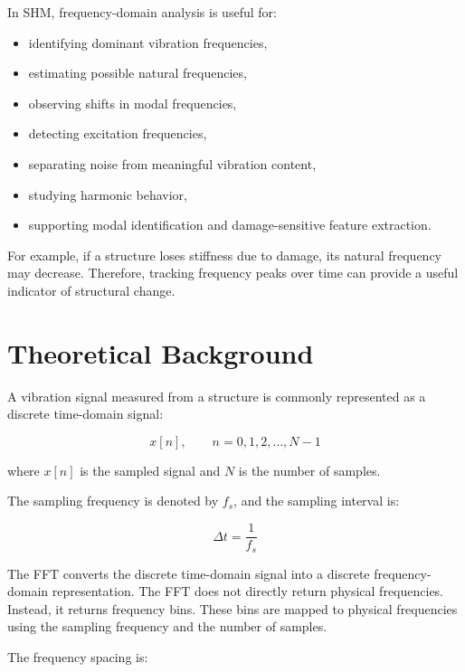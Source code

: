 \documentclass[11pt,a4paper]{article}
\begin{document}
In SHM, frequency-domain analysis is useful for:

\begin{itemize}
    \item identifying dominant vibration frequencies,
    \item estimating possible natural frequencies,
    \item observing shifts in modal frequencies,
    \item detecting excitation frequencies,
    \item separating noise from meaningful vibration content,
    \item studying harmonic behavior,
    \item supporting modal identification and damage-sensitive feature extraction.
\end{itemize}

For example, if a structure loses stiffness due to damage, its natural frequency may decrease. Therefore, tracking frequency peaks over time can provide a useful indicator of structural change.

\section{Theoretical Background}

A vibration signal measured from a structure is commonly represented as a discrete time-domain signal:

\begin{equation}
    x[n], \qquad n = 0,1,2,\dots,N-1
\end{equation}

where \(x[n]\) is the sampled signal and \(N\) is the number of samples.

The sampling frequency is denoted by \(f_s\), and the sampling interval is:

\begin{equation}
    \Delta t = \frac{1}{f_s}
\end{equation}

The FFT converts the discrete time-domain signal into a discrete frequency-domain representation. The FFT does not directly return physical frequencies. Instead, it returns frequency bins. These bins are mapped to physical frequencies using the sampling frequency and the number of samples.

The frequency spacing is:
\end{document}
